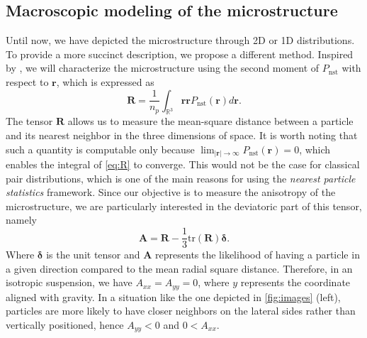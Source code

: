 \subsection{Macroscopic modeling of the microstructure}
Until now, we have depicted the microstructure through 2D or 1D distributions. To provide a more succinct description, we propose a different method. 
Inspired by \citet{zhang2023evolution}, we will characterize the microstructure using the second moment of $P_\text{nst}$ with respect to $\mathbf{r}$, which is expressed as
\begin{equation}
    \textbf{R} =\frac{1}{n_p} 
    \int_{\mathbb{R}^3} 
    \textbf{rr} P_\text{nst}(\textbf{r}) d\textbf{r}.
    \label{eq:R}
\end{equation}
The tensor $\textbf{R}$ allows us to measure the mean-square distance between a particle and its nearest neighbor in the three dimensions of space.
It is worth noting that such a quantity is computable only because $\lim_{|\textbf{r}|\to \infty} P_\text{nst}(\textbf{r}) = 0$, which enables the integral of \ref{eq:R} to converge. 
This would not be the case for classical pair distributions, which is one of the main reasons for using the \textit{nearest particle statistics} framework. Since our objective is to measure the anisotropy of the microstructure, we are particularly interested in the deviatoric part of this tensor, namely
\begin{equation*}
    \textbf{A} = \textbf{R} - \frac{1}{3}  \text{tr}(\textbf{R}) \bm\delta.
\end{equation*}
Where $\bm\delta$ is the unit tensor and 
$\textbf{A}$ represents the likelihood of having a particle in a given direction compared to the mean radial square distance. 
Therefore, in an isotropic suspension, we have $A_{xx} = A_{yy} = 0$, where $y$ represents the coordinate aligned with gravity. 
In a situation like the one depicted in \ref{fig:images} (left), particles are more likely to have closer neighbors on the lateral sides rather than vertically positioned, hence  $A_{yy} < 0$ and $0 < A_{xx}$. 


